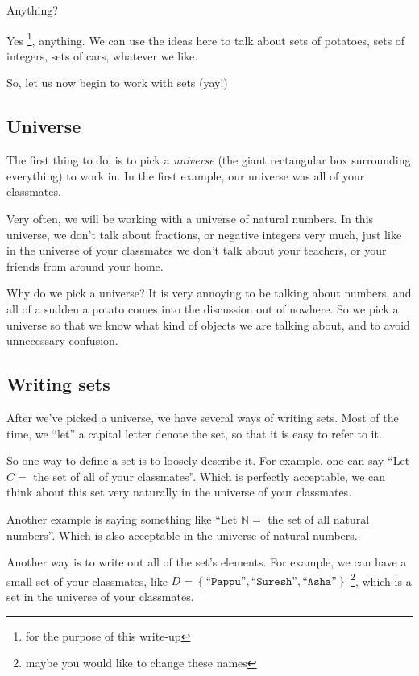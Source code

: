 \documentclass{article}
\def\N{\mathbb{N}}
\begin{document}
Anything?

Yes \footnote{for the purpose of this write-up}, anything.
We can use the ideas here to talk about sets of potatoes, sets
of integers, sets of cars, whatever we like.

So, let us now begin to work with sets (yay!)

\subsection{Universe}
The first thing to do, is to pick a \emph{universe}
(the giant rectangular box surrounding everything)
to work in.
In the first example, our universe was all of your classmates.

Very often, we will be working with a universe of natural numbers.
In this universe, we don't talk about fractions, or negative integers
very much, just like in the universe of your classmates we don't talk about
your teachers, or your friends from around your home.

Why do we pick a universe?
It is very annoying to be talking about numbers, and all of a sudden a potato
comes into the discussion out of nowhere.
So we pick a universe so that we know what kind of objects we are talking about,
and to avoid unnecessary confusion.

\subsection{Writing sets}
After we've picked a universe, we have several ways of writing sets.
Most of the time, we ``let'' a capital letter denote the set, 
so that it is easy to refer to it.

\vspace{1em}

So one way to define a set is to loosely describe it.
For example, one can say
``Let $C =$ the set of all of your classmates''.
Which is perfectly acceptable, we can think about this set
very naturally in the universe of your classmates.

Another example is saying something like
``Let $\N = $ the set of all natural numbers''.
Which is also acceptable in the universe of natural numbers.

\vspace{1em}

Another way is to write out all of the set's elements.
For example, we can have a small set of your classmates, like
$D = \left\{\texttt{``Pappu''}, \texttt{``Suresh''}, \texttt{``Asha''}\right\}$
\footnote{maybe you would like to change these names},
which is a set in the universe of your classmates.
\end{document}
